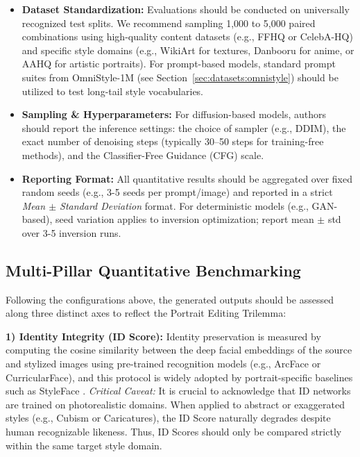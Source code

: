 \documentclass[journal]{IEEEtran}
\begin{document}
\begin{itemize}
\item \textbf{Dataset Standardization:} Evaluations should be conducted on universally recognized test splits. We recommend sampling 1,000 to 5,000 paired combinations using high-quality content datasets (e.g., FFHQ or CelebA-HQ) and specific style domains (e.g., WikiArt for textures, Danbooru for anime, or AAHQ for artistic portraits). For prompt-based models, standard prompt suites from OmniStyle-1M (see Section~\ref{sec:datasets:omnistyle}) should be utilized to test long-tail style vocabularies.
\item \textbf{Sampling \& Hyperparameters:} For diffusion-based models, authors should report the inference settings: the choice of sampler (e.g., DDIM), the exact number of denoising steps (typically 30--50 steps for training-free methods), and the Classifier-Free Guidance (CFG) scale.
\item \textbf{Reporting Format:} All quantitative results should be aggregated over fixed random seeds (e.g., 3-5 seeds per prompt/image) and reported in a strict \textit{Mean $\pm$ Standard Deviation} format. For deterministic models (e.g., GAN-based), seed variation applies to inversion optimization; report mean $\pm$ std over 3-5 inversion runs.
\end{itemize}

\subsection{Multi-Pillar Quantitative Benchmarking}
\label{sec:evaluation:quantitative}

Following the configurations above, the generated outputs should be assessed along three distinct axes to reflect the Portrait Editing Trilemma:

\textbf{1) Identity Integrity (ID Score):} Identity preservation is measured by computing the cosine similarity between the deep facial embeddings of the source and stylized images using pre-trained recognition models (e.g., ArcFace \cite{deng2019arcface} or CurricularFace), and this protocol is widely adopted by portrait-specific baselines such as StyleFace \cite{sain2023styleface}.
\textit{Critical Caveat:} It is crucial to acknowledge that ID networks are trained on photorealistic domains. When applied to abstract or exaggerated styles (e.g., Cubism or Caricatures), the ID Score naturally degrades despite human recognizable likeness. Thus, ID Scores should only be compared strictly within the same target style domain.
\end{document}
